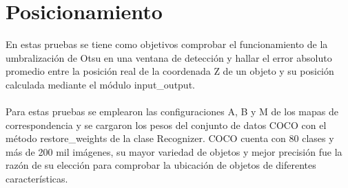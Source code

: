 \section{Posicionamiento}
En estas pruebas se tiene como objetivos comprobar el funcionamiento de la umbralización de Otsu en una ventana de detección y hallar el error absoluto promedio entre la posición real de la coordenada Z de un objeto y su posición calculada mediante el módulo input\_output.
\\
\\
Para estas pruebas se emplearon las configuraciones A, B y M de los mapas de correspondencia y se cargaron los pesos del conjunto de datos COCO con el método restore\_weights de la clase Recognizer. COCO cuenta con 80 clases y más de 200 mil imágenes, su mayor variedad de objetos y mejor precisión fue la razón de su elección para comprobar la ubicación de objetos de diferentes características.
